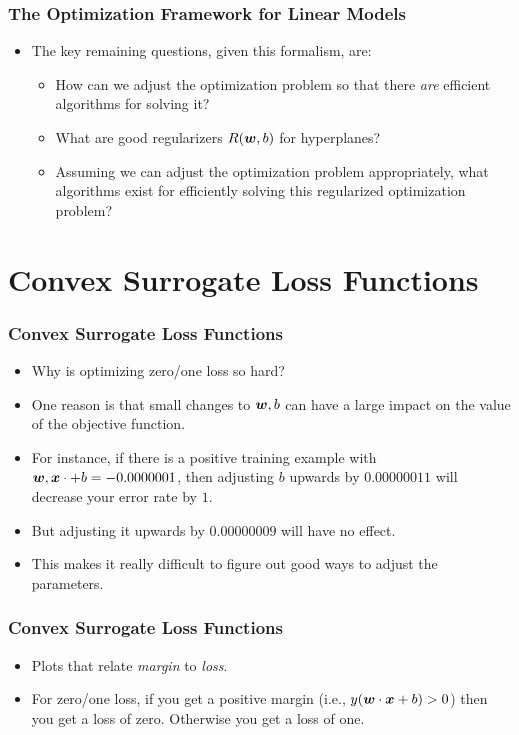 \documentclass[trans]{beamer}
\begin{document}
\begin{frame}
  \frametitle{The Optimization Framework for Linear Models}
\begin{itemize}
\item 
The key remaining questions, given this formalism, are:
\begin{itemize}
\item How can we adjust the optimization problem so that there
  \emph{are} efficient algorithms for solving it?
\item What are good regularizers $R({\boldsymbol{w}},b)$ for hyperplanes?
\item Assuming we can adjust the optimization problem appropriately,
  what algorithms exist for efficiently solving this regularized
  optimization problem?
\end{itemize}
\end{itemize}
\end{frame}

\section{Convex Surrogate Loss Functions}

\begin{frame}
  \frametitle{Convex Surrogate Loss Functions}
\begin{itemize}
\item 
Why is optimizing zero/one loss so hard?  
\item One reason is that small changes to ${\boldsymbol{w}},b$ can have a large impact on
the value of the objective function. 
\item For instance, if there is a
positive training example with ${\boldsymbol{w}},{\boldsymbol{x}} \cdot +b = -0.0000001$, then
adjusting $b$ upwards by $0.00000011$ will decrease your error rate by
$1$. 
\item But adjusting it upwards by $0.00000009$ will have no effect.
\item This makes it really difficult to figure out good ways to adjust the
parameters.
\end{itemize}
\end{frame}

\begin{frame}
  \frametitle{Convex Surrogate Loss Functions}
\begin{itemize}
\item 
Plots that relate
\emph{margin} to \emph{loss}.
\item For zero/one loss, if you get a positive margin (i.e., $y({\boldsymbol{w}} \cdot {\boldsymbol{x}}+b)>0$)
then you get a loss of zero.  Otherwise you get a loss of one. 
\end{itemize}
\end{frame}
\end{document}
